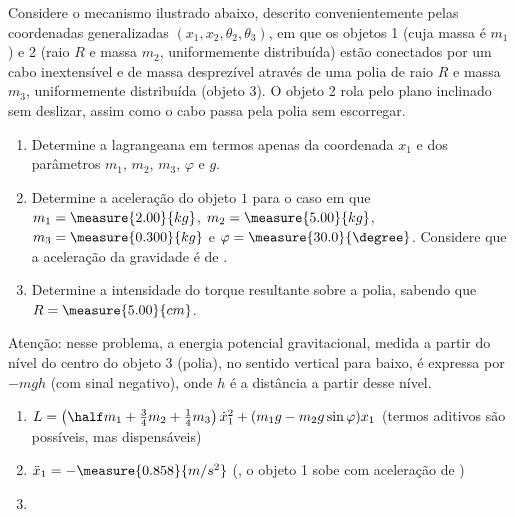 \begin{question}
	Considere o mecanismo ilustrado abaixo, descrito convenientemente pelas coordenadas generalizadas $(x_1, x_2, \theta_2, \theta_3)$, em que os objetos 1 (cuja massa é $m_1$) e 2 (raio $R$ e massa $m_2$, uniformemente distribuída) estão conectados por um cabo inextensível e de massa desprezível através de uma polia de raio $R$ e massa $m_3$, uniformemente distribuída (objeto 3).
	O objeto 2 rola pelo plano inclinado sem deslizar, assim como o cabo passa pela polia sem escorregar.

	\begin{enumerate}
		\item Determine a lagrangeana em termos apenas da coordenada $x_1$ e dos parâmetros $m_1$, $m_2$, $m_3$, $\varphi$ e $g$.
		\item Determine a aceleração do objeto $1$ para o caso em que $m_1 = \measure{2.00}{kg}$, $m_2 = \measure{5.00}{kg}$, $m_3 = \measure{0.300}{kg}$ e $\varphi = \measure{30.0}{\degree}$. %
		Considere que a aceleração da gravidade é de .		
		\item Determine a intensidade do torque resultante sobre a polia, sabendo que $R = \measure{5.00}{cm}$. %
	\end{enumerate}


	\begin{compactdesc}
		\item[Atenção:] nesse problema, a energia potencial gravitacional, medida a partir do nível do centro do objeto 3 (polia), no sentido vertical para baixo, é expressa por $-mgh$ (com sinal negativo), onde $h$ é a distância a partir desse nível.
	\end{compactdesc}

	\begin{answer}
		\begin{enumerate}
			\item $L = \left(\half m_1 + \frac{3}{4}m_2 + \frac{1}{4}m_3\right)\dot x_1^2 + (m_1 g - m_2 g \sin\varphi)x_1$ (termos aditivos são possíveis, mas dispensáveis)
			\item $\ddot x_1 = -\measure{0.858}{m/s^2}$ (\ie, o objeto 1 sobe com aceleração de ) %
			\item {} %
		\end{enumerate}
	\end{answer}


\end{question}
